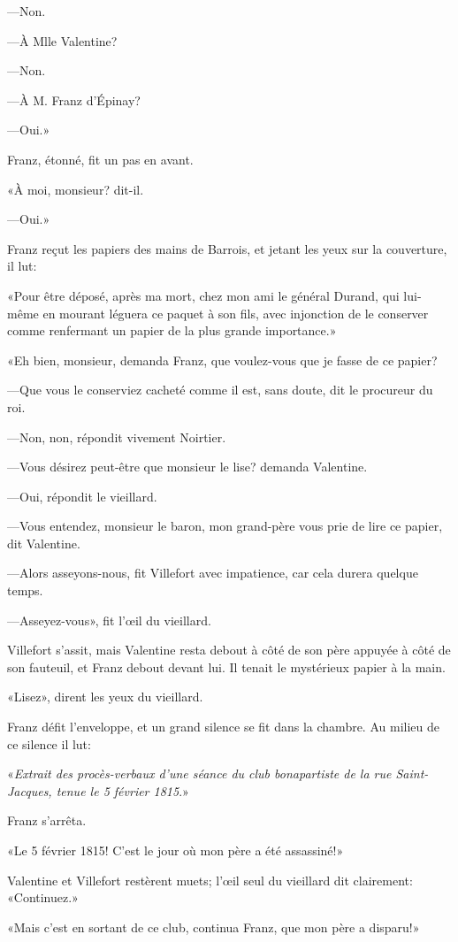 —Non. 

—À Mlle Valentine? 

—Non. 

—À M. Franz d'Épinay? 

—Oui.» 

Franz, étonné, fit un pas en avant. 

«À moi, monsieur? dit-il. 

—Oui.» 

Franz reçut les papiers des mains de Barrois, et jetant les yeux sur la couverture, il lut: 

«Pour être déposé, après ma mort, chez mon ami le général Durand, qui lui-même en mourant léguera ce paquet à son fils, avec injonction de le conserver comme renfermant un papier de la plus grande importance.» 

«Eh bien, monsieur, demanda Franz, que voulez-vous que je fasse de ce papier? 

—Que vous le conserviez cacheté comme il est, sans doute, dit le procureur du roi. 

—Non, non, répondit vivement Noirtier. 

—Vous désirez peut-être que monsieur le lise? demanda Valentine. 

—Oui, répondit le vieillard. 

—Vous entendez, monsieur le baron, mon grand-père vous prie de lire ce papier, dit Valentine. 

—Alors asseyons-nous, fit Villefort avec impatience, car cela durera quelque temps. 

—Asseyez-vous», fit l'œil du vieillard. 

Villefort s'assit, mais Valentine resta debout à côté de son père appuyée à côté de son fauteuil, et Franz debout devant lui. Il tenait le mystérieux papier à la main. 

«Lisez», dirent les yeux du vieillard. 

Franz défit l'enveloppe, et un grand silence se fit dans la chambre. Au milieu de ce silence il lut: 

«\textit{Extrait des procès-verbaux d'une séance du club bonapartiste de la rue Saint-Jacques, tenue le 5 février 1815}.» 

Franz s'arrêta. 

«Le 5 février 1815! C'est le jour où mon père a été assassiné!»  

Valentine et Villefort restèrent muets; l'œil seul du vieillard dit clairement: «Continuez.» 

«Mais c'est en sortant de ce club, continua Franz, que mon père a disparu!» 

